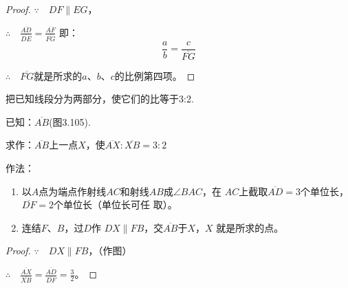 \begin{proof}
$\because\quad DF\parallel EG$，

$\therefore\quad \frac{\overline{AD}}{\overline{DE}}=\frac{\overline{AF}}{\overline{FG}}$
即：
\[\frac{a}{b}=\frac{c}{\overline{FG}}\]

$\therefore\quad \overline{FG}$就是所求的$a$、$b$、$c$的比例第四项。

    
\end{proof}

\begin{example}
   把已知线段分为两部分，使它们的比等于3:2.

已知：$\overline{AB}$(图3.105).

求作：$\overline{AB}$上一点$X$，使$\overline{AX}:\overline{XB}=3:2$

作法：
\begin{enumerate}
    \item 以$A$点为端点作射线$AC$和射线$AB$成$\angle BAC$，在
    $AC$上截取$\overline{AD}=3$个单位长，$\overline{DF}=2$个单位长（单位长可任
    取）。
\item 连结$F$、$B$，过$D$作
    $DX\parallel FB$，交$\overline{AB}$于$X$，$X$
    就是所求的点。
\end{enumerate}
\end{example}

\begin{proof}
$\because\quad DX\parallel FB$，（作图）

$\therefore\quad \frac{\overline{AX}}{\overline{XB}}=\frac{\overline{AD}}{\overline{DF}}=\frac{3}{2}$。
\end{proof}

